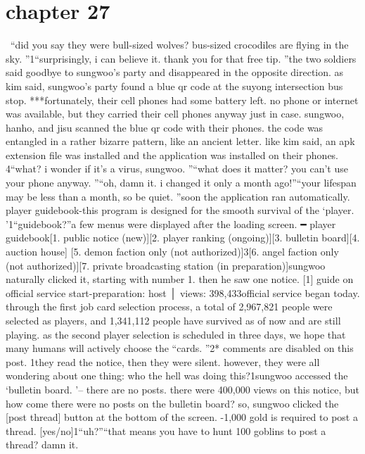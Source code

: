 \section{chapter 27}






 “did you say they were bull-sized wolves? bus-sized crocodiles are flying in the sky.
”1“surprisingly, i can believe it.
 thank you for that free tip.
”the two soldiers said goodbye to sungwoo’s party and disappeared in the opposite direction.
as kim said, sungwoo’s party found a blue qr code at the suyong intersection bus stop.
***fortunately, their cell phones had some battery left.
 no phone or internet was available, but they carried their cell phones anyway just in case.
sungwoo, hanho, and jisu scanned the blue qr code with their phones.
 the code was entangled in a rather bizarre pattern, like an ancient letter.
like kim said, an apk extension file was installed and the application was installed on their phones.
4“what? i wonder if it’s a virus, sungwoo.
”“what does it matter? you can’t use your phone anyway.
”“oh, damn it.
 i changed it only a month ago!”“your lifespan may be less than a month, so be quiet.
”soon the application ran automatically.
player guidebook-this program is designed for the smooth survival of the ‘player.
’1“guidebook?”a few menus were displayed after the loading screen.
━ player guidebook[1.
 public notice (new)][2.
 player ranking (ongoing)][3.
 bulletin board][4.
 auction house]
[5.
 demon faction only (not authorized)]3[6.
 angel faction only (not authorized)][7.
 private broadcasting station (in preparation)]sungwoo naturally clicked it, starting with number 1.
 then he saw one notice.
[1] guide on official service start-preparation: host │ views: 398,433official service began today.
 through the first job card selection process, a total of 2,967,821 people were selected as players, and 1,341,112 people have survived as of now and are still playing.
 as the second player selection is scheduled in three days, we hope that many humans will actively choose the “cards.
”2* comments are disabled on this post.
1they read the notice, then they were silent.
 however, they were all wondering about one thing: who the hell was doing this?1sungwoo accessed the ‘bulletin board.
’– there are no posts.
there were 400,000 views on this notice, but how come there were no posts on the bulletin board? so, sungwoo clicked the [post thread] button at the bottom of the screen.
-1,000 gold is required to post a thread.
 [yes/no]1“uh?”“that means you have to hunt 100 goblins to post a thread? damn it.
